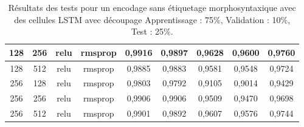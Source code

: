 \begin{table}[H]
{\begin{tabular}{|c|c|c|c|c|c|c|c|c|}
				\rowcolor[HTML]{96FFFB} 
				128 & 256 & relu & rmsprop & 0,9916 & 0,9897 & 0,9628 & 0,9600 & \textbf{0,9760} \\ \hline
				128 & 512 & relu & rmsprop & 0,9885 & 0,9883 & 0,9581 & 0,9548 & 0,9724 \\ \hline
				256 & 128 & relu & rmsprop & 0,9803 & 0,9792 & 0,9105 & 0,9014 & 0,9429 \\ \hline
				256 & 256 & relu & rmsprop & 0,9906 & 0,9906 & 0,9509 & 0,9470 & 0,9698 \\ \hline
				256 & 512 & relu & rmsprop & 0,9901 & 0,9892 & 0,9607 & 0,9576 & 0,9744 \\ \hline
			\end{tabular}%
		}
		\caption{Résultats des tests pour un encodage sans étiquetage morphosyntaxique avec des cellules LSTM avec découpage Apprentissage : 75\%, Validation : 10\%, Test : 25\%.}
		\label{tab:lstm_3}
	\end{table}
	

